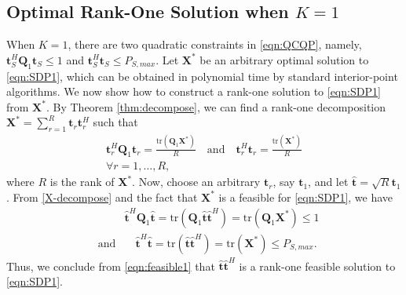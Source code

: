 \documentclass[twocolumn,10pt]{IEEEtran}
\theoremstyle{plain} \newtheorem{theorem}{Theorem}
\theoremstyle{plain} \newtheorem{proposition}{Proposition}
\theoremstyle{plain} \newtheorem{corollary}{Corollary}
\theoremstyle{remark} \newtheorem{remark}{Remark}
\theoremstyle{remark} \newtheorem{lemma}{Lemma}
\theoremstyle{plain} \newtheorem{definition}{Definition}
\theoremstyle{plain} \newtheorem{assumption}{Assumption}
\theoremstyle{plain} \newtheorem{fact}{Fact}
\begin{document}
\subsection{Optimal Rank-One Solution when $K=1$}\label{subsection:4-1}
When $K=1$, there are two quadratic constraints in \eqref{eqn:QCQP}, namely, $\mathbf{t}_S^H\mathbf{Q}_1\mathbf{t}_S \leq 1$ and $\mathbf{t}_S^H\mathbf{t}_S \leq P_{S,max}$. Let $\mathbf{X}^*$ be an arbitrary optimal solution to \eqref{eqn:SDP1}, which can be obtained in polynomial time by standard interior-point algorithms. We now show how to construct a rank-one solution to \eqref{eqn:SDP1} from $\mathbf{X}^*$.  By Theorem \ref{thm:decompose}, we can find a rank-one decomposition $\mathbf{X^*}=\sum_{r=1}^R\mathbf{t}_r\mathbf{t}_r^H$ such that
\begin{eqnarray}\label{X-decompose}
\mathbf{t}_r^H\mathbf{Q}_1\mathbf{t}_r=\frac{\mathrm{tr}(\mathbf{Q}_1\mathbf{X^*})}{R} \quad\mbox{and}\quad \mathbf{t}_r^H\mathbf{t}_r=\frac{\mathrm{tr}(\mathbf{X^*})}{R} \nonumber\\
\forall r=1,\ldots,R,
\end{eqnarray}
where $R$ is the rank of $\mathbf{X^*}$. Now, choose an arbitrary $\mathbf{t}_r$, say $\mathbf{t}_1$, and let $\mathbf{\hat{t}}=\sqrt{R}\mathbf{t}_1$. From \eqref{X-decompose} and the fact that $\mathbf{X^*}$ is a feasible for \eqref{eqn:SDP1}, we have
\begin{eqnarray}\label{eqn:feasible1}
&&\mathbf{\hat{t}}^H\mathbf{Q}_1\mathbf{\hat{t}}=\mathrm{tr}(\mathbf{Q}_1\mathbf{\hat{t}}\mathbf{\hat{t}}^H)=\mathrm{tr}(\mathbf{Q}_1\mathbf{X^*})\leq 1 \nonumber\\
&\mbox{and}&\quad \mathbf{\hat{t}}^H\mathbf{\hat{t}}=\mathrm{tr}(\mathbf{\hat{t}}\mathbf{\hat{t}}^H)=\mathrm{tr}(\mathbf{X^*})\leq P_{S,max}.
\end{eqnarray}
Thus, we conclude from \eqref{eqn:feasible1} that $\mathbf{\hat{t}}\mathbf{\hat{t}}^H$ is a rank-one feasible solution to \eqref{eqn:SDP1}.
\end{document}
